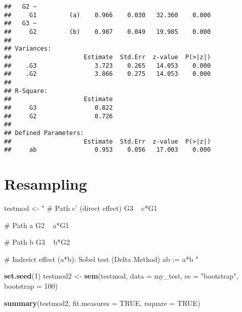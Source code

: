 \documentclass[
]{article}
\newenvironment{Shaded}{\begin{snugshade}}{\end{snugshade}}
\newcommand{\DataTypeTok}[1]{\textcolor[rgb]{0.13,0.29,0.53}{#1}}
\newcommand{\DecValTok}[1]{\textcolor[rgb]{0.00,0.00,0.81}{#1}}
\newcommand{\KeywordTok}[1]{\textcolor[rgb]{0.13,0.29,0.53}{\textbf{#1}}}
\newcommand{\NormalTok}[1]{#1}
\newcommand{\OtherTok}[1]{\textcolor[rgb]{0.56,0.35,0.01}{#1}}
\newcommand{\StringTok}[1]{\textcolor[rgb]{0.31,0.60,0.02}{#1}}
\begin{document}
\begin{verbatim}
##   G2 ~                                                
##     G1         (a)    0.966    0.030   32.360    0.000
##   G3 ~                                                
##     G2         (b)    0.987    0.049   19.985    0.000
## 
## Variances:
##                    Estimate  Std.Err  z-value  P(>|z|)
##    .G3                3.723    0.265   14.053    0.000
##    .G2                3.866    0.275   14.053    0.000
## 
## R-Square:
##                    Estimate
##     G3                0.822
##     G2                0.726
## 
## Defined Parameters:
##                    Estimate  Std.Err  z-value  P(>|z|)
##     ab                0.953    0.056   17.003    0.000
\end{verbatim}

\hypertarget{resampling}{%
\section{Resampling}\label{resampling}}

\begin{Shaded}
\begin{Highlighting}[]
\NormalTok{testmod <-}\StringTok{ "}
\StringTok{# Path c' (direct effect)}
\StringTok{G3 ~ c*G1 }

\StringTok{# Path a}
\StringTok{G2 ~ a*G1}

\StringTok{# Path b}
\StringTok{G3 ~ b*G2}

\StringTok{# Indreict effect (a*b): Sobel test (Delta Method)}
\StringTok{ab := a*b}
\StringTok{"}

\KeywordTok{set.seed}\NormalTok{(}\DecValTok{1}\NormalTok{)}
\NormalTok{testmod2 <-}\StringTok{ }\KeywordTok{sem}\NormalTok{(testmod, }\DataTypeTok{data =}\NormalTok{ my_test,}
                \DataTypeTok{se =} \StringTok{"bootstrap"}\NormalTok{, }\DataTypeTok{bootstrap =} \DecValTok{100}\NormalTok{)}
\end{Highlighting}
\end{Shaded}

\begin{Shaded}
\begin{Highlighting}[]
\KeywordTok{summary}\NormalTok{(testmod2,  }\DataTypeTok{fit.measures =} \OtherTok{TRUE}\NormalTok{, }\DataTypeTok{rsquare =} \OtherTok{TRUE}\NormalTok{)}
\end{Highlighting}
\end{Shaded}
\end{document}
